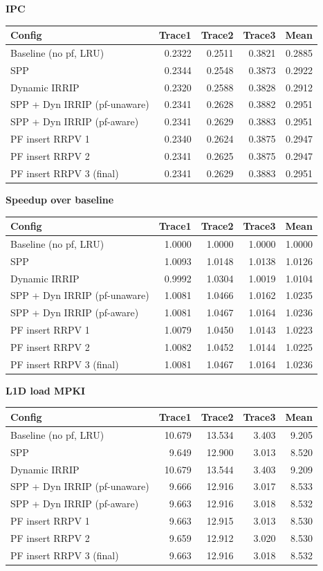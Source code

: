 \textbf{IPC}\\[2pt]
\begin{tabular}{lrrrr}\toprule
Config & Trace1 & Trace2 & Trace3 & Mean \\ \midrule
Baseline (no pf, LRU) & 0.2322 & 0.2511 & 0.3821 & 0.2885 \\
SPP & 0.2344 & 0.2548 & 0.3873 & 0.2922 \\
Dynamic IRRIP & 0.2320 & 0.2588 & 0.3828 & 0.2912 \\
SPP + Dyn IRRIP (pf-unaware) & 0.2341 & 0.2628 & 0.3882 & 0.2951 \\
SPP + Dyn IRRIP (pf-aware) & 0.2341 & 0.2629 & 0.3883 & 0.2951 \\
PF insert RRPV 1 & 0.2340 & 0.2624 & 0.3875 & 0.2947 \\
PF insert RRPV 2 & 0.2341 & 0.2625 & 0.3875 & 0.2947 \\
PF insert RRPV 3 (final) & 0.2341 & 0.2629 & 0.3883 & 0.2951 \\
\bottomrule\end{tabular}
\medskip

\textbf{Speedup over baseline}\\[2pt]
\begin{tabular}{lrrrr}\toprule
Config & Trace1 & Trace2 & Trace3 & Mean \\ \midrule
Baseline (no pf, LRU) & 1.0000 & 1.0000 & 1.0000 & 1.0000 \\
SPP & 1.0093 & 1.0148 & 1.0138 & 1.0126 \\
Dynamic IRRIP & 0.9992 & 1.0304 & 1.0019 & 1.0104 \\
SPP + Dyn IRRIP (pf-unaware) & 1.0081 & 1.0466 & 1.0162 & 1.0235 \\
SPP + Dyn IRRIP (pf-aware) & 1.0081 & 1.0467 & 1.0164 & 1.0236 \\
PF insert RRPV 1 & 1.0079 & 1.0450 & 1.0143 & 1.0223 \\
PF insert RRPV 2 & 1.0082 & 1.0452 & 1.0144 & 1.0225 \\
PF insert RRPV 3 (final) & 1.0081 & 1.0467 & 1.0164 & 1.0236 \\
\bottomrule\end{tabular}
\medskip

\textbf{L1D load MPKI}\\[2pt]
\begin{tabular}{lrrrr}\toprule
Config & Trace1 & Trace2 & Trace3 & Mean \\ \midrule
Baseline (no pf, LRU) & 10.679 & 13.534 & 3.403 & 9.205 \\
SPP & 9.649 & 12.900 & 3.013 & 8.520 \\
Dynamic IRRIP & 10.679 & 13.544 & 3.403 & 9.209 \\
SPP + Dyn IRRIP (pf-unaware) & 9.666 & 12.916 & 3.017 & 8.533 \\
SPP + Dyn IRRIP (pf-aware) & 9.663 & 12.916 & 3.018 & 8.532 \\
PF insert RRPV 1 & 9.663 & 12.915 & 3.013 & 8.530 \\
PF insert RRPV 2 & 9.659 & 12.912 & 3.020 & 8.530 \\
PF insert RRPV 3 (final) & 9.663 & 12.916 & 3.018 & 8.532 \\
\bottomrule\end{tabular}
\medskip

